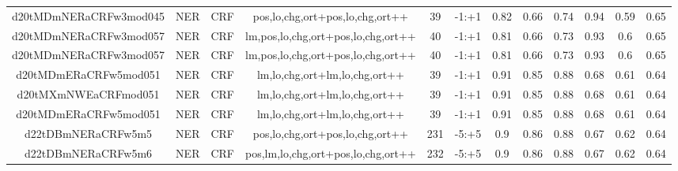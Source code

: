 \documentclass[a4paper]{article}
\begin{document}
\begin{landscape}
\begin{center}
\begin{tabular}{ |c|c|c|c|c|c|c|c|c|c|c|c|}
 	
 
 	
 		
 		\small{ d20tMDmNERaCRFw3mod045 } & NER & CRF & pos,lo,chg,ort+pos,lo,chg,ort++  &  39 &  -1:+1  &  0.82 & 0.66 & 0.74  &  0.94 & 0.59 & 0.65 \\
 		

 	
 
 	
 		
 		\small{ d20tMDmNERaCRFw3mod057 } & NER & CRF & lm,pos,lo,chg,ort+pos,lo,chg,ort++  &  40 &  -1:+1  &  0.81 & 0.66 & 0.73  &  0.93 & 0.6 & 0.65 \\
 		

 	
 
 	
 		
 		\small{ d20tMDmNERaCRFw3mod057 } & NER & CRF & lm,pos,lo,chg,ort+pos,lo,chg,ort++  &  40 &  -1:+1  &  0.81 & 0.66 & 0.73  &  0.93 & 0.6 & 0.65 \\
 		

 	
 
 	
 		
 		\small{ d20tMDmERaCRFw5mod051 } & NER & CRF & lm,lo,chg,ort+lm,lo,chg,ort++  &  39 &  -1:+1  &  0.91 & 0.85 & 0.88  &  0.68 & 0.61 & 0.64 \\
 		

 	
 
 	
 		
 		\small{ d20tMXmNWEaCRFmod051 } & NER & CRF & lm,lo,chg,ort+lm,lo,chg,ort++  &  39 &  -1:+1  &  0.91 & 0.85 & 0.88  &  0.68 & 0.61 & 0.64 \\
 		

 	
 
 	
 		
 		\small{ d20tMDmERaCRFw5mod051 } & NER & CRF & lm,lo,chg,ort+lm,lo,chg,ort++  &  39 &  -1:+1  &  0.91 & 0.85 & 0.88  &  0.68 & 0.61 & 0.64 \\
 		

 	
 
 	
 		
 		\small{ d22tDBmNERaCRFw5m5 } & NER & CRF & pos,lo,chg,ort+pos,lo,chg,ort++  &  231 &  -5:+5  &  0.9 & 0.86 & 0.88  &  0.67 & 0.62 & 0.64 \\
 		

 	
 
 	
 		
 		\small{ d22tDBmNERaCRFw5m6 } & NER & CRF & pos,lm,lo,chg,ort+pos,lo,chg,ort++  &  232 &  -5:+5  &  0.9 & 0.86 & 0.88  &  0.67 & 0.62 & 0.64 \\
 		

 	
 

\end{tabular}
\end{center}
\end{landscape}
\end{document}
